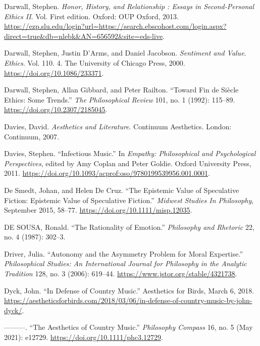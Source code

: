 \documentclass[phdthesis,12pt,final]{wuthesis}
\newlength{\cslhangindent}
\newenvironment{CSLReferences}[2] %
{\begin{list}{}{%
	\setlength{\itemindent}{0pt}
	\setlength{\leftmargin}{0pt}
	\setlength{\parsep}{0pt}
	\ifodd #1
	\setlength{\leftmargin}{\cslhangindent}
	\setlength{\itemindent}{-1\cslhangindent}
	\fi
	\setlength{\itemsep}{#2\baselineskip}}}
{\end{list}}
\theoremstyle{definition}
\theoremstyle{definition}
\theoremstyle{definition}
\theoremstyle{definition}
\theoremstyle{remark}
\begin{document}
\begin{CSLReferences}{1}{0}
Darwall, Stephen. \emph{Honor, {History}, and {Relationship} : {Essays} in {Second-Personal Ethics II}}. Vol. First edition. Oxford: OUP Oxford, 2013. \url{https://ezp.slu.edu/login?url=https://search.ebscohost.com/login.aspx?direct=true&db=nlebk&AN=656592&site=eds-live}.

Darwall, Stephen, Justin D'Arms, and Daniel Jacobson. \emph{Sentiment and {Value}}. \emph{Ethics}. Vol. 110. 4. The University of Chicago Press, 2000. \url{https://doi.org/10.1086/233371}.

Darwall, Stephen, Allan Gibbard, and Peter Railton. {``Toward Fin de Siècle Ethics: Some Trends.''} \emph{The Philosophical Review} 101, no. 1 (1992): 115--89. \url{https://doi.org/10.2307/2185045}.

Davies, David. \emph{Aesthetics and Literature}. Continuum Aesthetics. London: Continuum, 2007.

Davies, Stephen. {``Infectious {Music}.''} In \emph{Empathy: {Philosophical} and {Psychological Perspectives}}, edited by Amy Coplan and Peter Goldie. Oxford University Press, 2011. \url{https://doi.org/10.1093/acprof:oso/9780199539956.001.0001}.

De Smedt, Johan, and Helen De Cruz. {``The Epistemic Value of Speculative Fiction: Epistemic Value of Speculative Fiction.''} \emph{Midwest Studies In Philosophy}, September 2015, 58--77. \url{https://doi.org/10.1111/misp.12035}.

DE SOUSA, Ronald. {``The {Rationality} of {Emotion}.''} \emph{Philosophy and Rhetoric} 22, no. 4 (1987): 302--3.

Driver, Julia. {``Autonomy and the {Asymmetry Problem} for {Moral Expertise}.''} \emph{Philosophical Studies: An International Journal for Philosophy in the Analytic Tradition} 128, no. 3 (2006): 619--44. \url{https://www.jstor.org/stable/4321738}.

Dyck, John. {``In Defense of Country Music.''} Aesthetics for Birds, March 6, 2018. \url{https://aestheticsforbirds.com/2018/03/06/in-defense-of-country-music-by-john-dyck/}.

---------. {``The Aesthetics of Country Music.''} \emph{Philosophy Compass} 16, no. 5 (May 2021): e12729. \url{https://doi.org/10.1111/phc3.12729}.


\end{CSLReferences}
\end{document}
